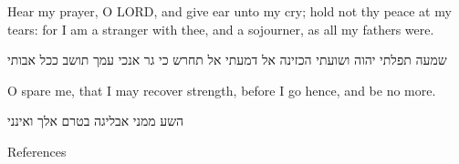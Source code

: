 \documentclass[dark]{gsf-presentation}
\newcommand{\LORD}{L{\fontsize{11}{11}\selectfont{}ORD}}
\begin{document}
\begin{frame}
	\LARGE
	\begin{english}
		\begin{center}
			Hear my prayer, O \LORD{}, and give ear unto
			my cry; hold not thy peace at my tears: for I
			am a stranger with thee, and a sojourner, as
			all my fathers were.
		\end{center}
	\end{english}

	\begin{hebrew}
		\begin{center}
			שמעה תפלתי יהוה ושועתי הכזינה אל דמעתי אל
			תחרש כי גר אנכי עמך תושב ככל אבותי
		\end{center}
	\end{hebrew}
\end{frame}

\begin{frame}
	\LARGE
	\begin{english}
		\begin{center}
			O spare me, that I may recover strength, before
			I go hence, and be no more.
		\end{center}
	\end{english}

	\begin{hebrew}
		\begin{center}
השע ממני אבליגה בטרם אלך ואינני
		\end{center}
	\end{hebrew}
\end{frame}

\begin{frame}{References}
	\printbibliography
\end{frame}
\end{document}
